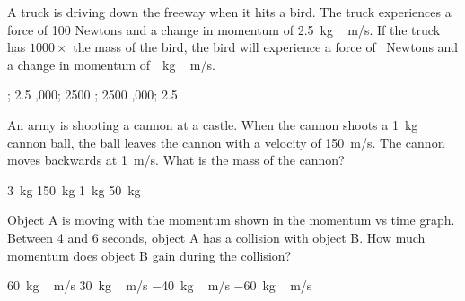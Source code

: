 \documentclass[]{exam}
\begin{document}
\begin{questions}
\question
A truck is driving down the freeway when it hits a bird. The truck experiences a force of 100 Newtons and a change in momentum of \SI{2.5}{kg\,m/s}. If the truck has $1000\times$ the mass of the bird, the bird will experience a force of \fillin\ Newtons and a change in momentum of \fillin\,\SI{}{kg\,m/s}.

\begin{randomizechoices}
    ; 2.5
    ,000; 2500
    ; 2500
    ,000; 2.5
\end{randomizechoices}

\question
An army is shooting a cannon at a castle. When the cannon shoots a \SI{1}{kg} cannon ball, the ball leaves the cannon with a velocity of \SI{150}{m/s}. The cannon moves backwards at \SI{1}{m/s}. What is the mass of the cannon?

\begin{randomizechoices}
    \choice \SI{3}{kg}
    \correctchoice \SI{150}{kg}
    \choice \SI{1}{kg}
    \choice \SI{50}{kg}
\end{randomizechoices}

\question
Object A is moving with the momentum shown in the momentum vs time graph. Between 4 and 6 seconds, object A has a collision with object B. How much momentum does object B gain during the collision?

\begin{minipage}{0.3\textwidth}
\centering
    \begin{randomizechoices}
        \correctchoice \SI{60}{kg\,m/s}
        \choice \SI{30}{kg\,m/s}
        \choice \SI{-40}{kg\,m/s}
        \choice \SI{-60}{kg\,m/s}
    \end{randomizechoices}
\end{minipage}%
\begin{minipage}{0.6\textwidth}
\centering
\end{minipage}


\end{questions}
\end{document}
